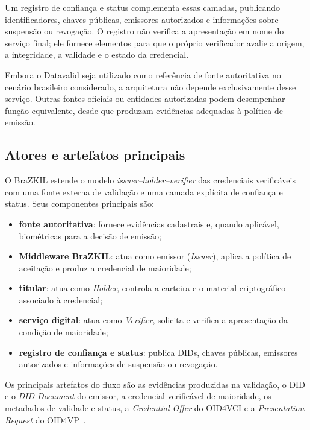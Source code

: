 \documentclass[12pt]{article}
\begin{document}
Um registro de confiança e status complementa essas camadas, publicando
identificadores, chaves públicas, emissores autorizados e informações sobre
suspensão ou revogação. O registro não verifica a apresentação em nome do
serviço final; ele fornece elementos para que o próprio verificador avalie
a origem, a integridade, a validade e o estado da credencial.

Embora o Datavalid seja utilizado como referência de fonte autoritativa no
cenário brasileiro considerado, a arquitetura não depende exclusivamente
desse serviço. Outras fontes oficiais ou entidades autorizadas podem
desempenhar função equivalente, desde que produzam evidências adequadas à
política de emissão.

\subsection{Atores e artefatos principais}
\label{sec:atores-artefatos}

O BraZKIL estende o modelo \textit{issuer--holder--verifier} das
credenciais verificáveis~\cite{w3cvc2025} com uma fonte externa de
validação e uma camada explícita de confiança e status. Seus componentes
principais são:

\begin{itemize}
    \setlength{\itemsep}{1pt}

    \item \textbf{fonte autoritativa}: fornece evidências cadastrais e,
    quando aplicável, biométricas para a decisão de emissão;

    \item \textbf{Middleware BraZKIL}: atua como emissor
    (\textit{Issuer}), aplica a política de aceitação e produz a credencial
    de maioridade;

    \item \textbf{titular}: atua como \textit{Holder}, controla a carteira
    e o material criptográfico associado à credencial;

    \item \textbf{serviço digital}: atua como \textit{Verifier}, solicita
    e verifica a apresentação da condição de maioridade;

    \item \textbf{registro de confiança e status}: publica DIDs, chaves
    públicas, emissores autorizados e informações de suspensão ou
    revogação.
\end{itemize}

Os principais artefatos do fluxo são as evidências produzidas na validação,
o DID e o \textit{DID Document} do emissor, a credencial verificável de
maioridade, os metadados de validade e status, a \textit{Credential Offer}
do OID4VCI e a \textit{Presentation Request} do
OID4VP~\cite{w3cdid2022,w3cvc2025,openid4vci2024,openid4vp2023}.
\end{document}
